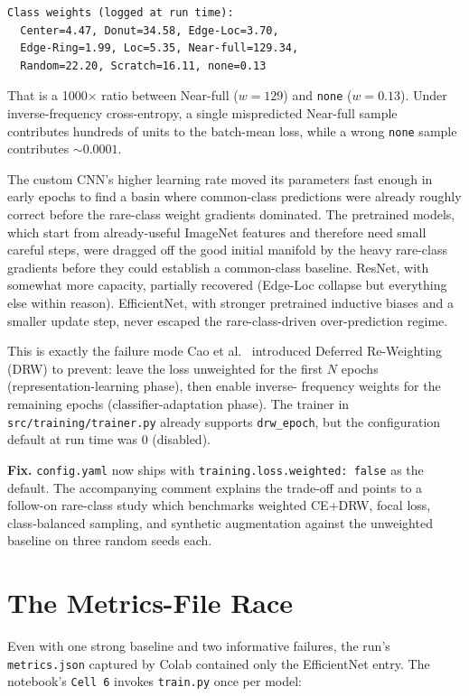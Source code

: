 \documentclass[conference]{IEEEtran}
\begin{document}
\begin{lstlisting}
Class weights (logged at run time):
  Center=4.47, Donut=34.58, Edge-Loc=3.70,
  Edge-Ring=1.99, Loc=5.35, Near-full=129.34,
  Random=22.20, Scratch=16.11, none=0.13
\end{lstlisting}

That is a 1000$\times$ ratio between Near-full ($w = 129$) and
\texttt{none} ($w = 0.13$). Under inverse-frequency cross-entropy, a
single mispredicted Near-full sample contributes hundreds of units to the
batch-mean loss, while a wrong \texttt{none} sample contributes
$\sim 0.0001$.

The custom CNN's higher learning rate moved its parameters fast enough in
early epochs to find a basin where common-class predictions were already
roughly correct before the rare-class weight gradients dominated. The
pretrained models, which start from already-useful ImageNet features and
therefore need small careful steps, were dragged off the good initial
manifold by the heavy rare-class gradients before they could establish a
common-class baseline. ResNet, with somewhat more capacity, partially
recovered (Edge-Loc collapse but everything else within reason).
EfficientNet, with stronger pretrained inductive biases and a smaller
update step, never escaped the rare-class-driven over-prediction regime.

This is exactly the failure mode Cao et al.~\cite{cao2019} introduced
Deferred Re-Weighting (DRW) to prevent: leave the loss unweighted for the
first $N$ epochs (representation-learning phase), then enable inverse-
frequency weights for the remaining epochs (classifier-adaptation phase).
The trainer in \texttt{src/training/trainer.py} already supports
\texttt{drw\_epoch}, but the configuration default at run time was 0
(disabled).

\textbf{Fix.} \texttt{config.yaml} now ships with
\texttt{training.loss.weighted: false} as the default. The accompanying
comment explains the trade-off and points to a follow-on rare-class study
which benchmarks weighted CE+DRW, focal loss, class-balanced sampling,
and synthetic augmentation against the unweighted baseline on three random
seeds each.

\section{The Metrics-File Race}

Even with one strong baseline and two informative failures, the run's
\texttt{metrics.json} captured by Colab contained only the EfficientNet
entry. The notebook's \texttt{Cell 6} invokes \texttt{train.py} once per
model:
\end{document}
